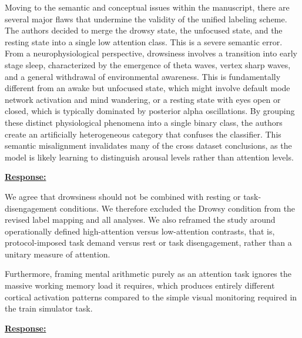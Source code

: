 \documentclass{article}
\begin{document}
\begin{cmt}{}{}

Moving to the semantic and conceptual issues within the manuscript, there are
several major flaws that undermine the validity of the unified labeling scheme.
The authors decided to merge the drowsy state, the unfocused state, and the
resting state into a single low attention class. This is a severe semantic
error. From a neurophysiological perspective, drowsiness involves a transition
into early stage sleep, characterized by the emergence of theta waves, vertex
sharp waves, and a general withdrawal of environmental awareness. This is
fundamentally different from an awake but unfocused state, which might involve
default mode network activation and mind wandering, or a resting state with eyes
open or closed, which is typically dominated by posterior alpha oscillations. By
grouping these distinct physiological phenomena into a single binary class, the
authors create an artificially heterogeneous category that confuses the
classifier. This semantic misalignment invalidates many of the cross dataset
conclusions, as the model is likely learning to distinguish arousal levels
rather than attention levels.

\end{cmt}
\vspace{0.1cm}
\noindent
\underline{\textbf{Response:}}
\vspace{0.2cm}

We agree that drowsiness should not be combined with resting or
task-disengagement conditions. We therefore excluded the Drowsy condition from
the revised label mapping and all analyses. We also reframed the study around
operationally defined high-attention versus low-attention contrasts, that is,
protocol-imposed task demand versus rest or task disengagement, rather
than a unitary measure of attention.

\vspace{0.3cm}


\begin{cmt}{}{}

Furthermore, framing mental arithmetic purely as an attention task ignores the
massive working memory load it requires, which produces entirely different
cortical activation patterns compared to the simple visual monitoring required
in the train simulator task.

\end{cmt}
\vspace{0.1cm}
\noindent
\underline{\textbf{Response:}}
\vspace{0.2cm}
\end{document}
